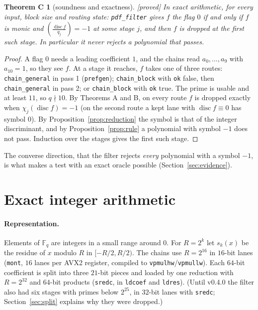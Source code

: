 \documentclass[10pt,a4paper]{article}
\newcommand{\Fq}{\mathbb{F}_q}
\DeclareMathOperator{\disc}{disc}
\newcommand{\leg}[2]{\left(\frac{#1}{#2}\right)}
\newcommand{\code}[1]{\texttt{#1}}
\newcommand{\stproved}{\textsf{\small[proved]}\xspace}
\theoremstyle{plain}
\newtheorem*{thmC}{Theorem C}
\theoremstyle{definition}
\begin{document}
\begin{thmC}[soundness and exactness]\stproved
In exact arithmetic, for every input, block size and routing state: \code{pdf\_filter} gives $f$ the flag $0$ if and only if $f$ is monic and
$\leg{\disc f}{q_j}=-1$ at some stage $j$, and then $f$ is dropped at the first such stage.  In particular it never rejects a polynomial that passes.
\end{thmC}
\begin{proof}
A flag $0$ needs a leading coefficient $1$, and the chains read $a_0,\dots,a_9$ with $a_{10}=1$, so they see $f$.  At a stage it reaches, $f$ takes one of three routes:
\code{chain\_general} in pass 1 (\code{prefgen}); \code{chain\_block} with \code{ok} false, then \code{chain\_general} in pass 2; or \code{chain\_block} with \code{ok}
true.  The prime is usable and at least $11$, so $q\nmid10$.  By Theorems A and B, on every route $f$ is dropped exactly when $\chi_j(\disc f)=-1$ (on the second route
a kept lane with $\disc f\equiv0$ has symbol $0$).  By Proposition~\ref{prop:reduction} the symbol is that of the integer discriminant, and by
Proposition~\ref{prop:rule} a polynomial with symbol $-1$ does not pass.  Induction over the stages gives the first such stage.
\end{proof}

The converse direction, that the filter rejects \emph{every} polynomial with a symbol $-1$, is what makes a test with an exact oracle possible
(Section~\ref{sec:evidence}).

\section{Exact integer arithmetic}\label{sec:integer}

\paragraph{Representation.}  Elements of $\Fq$ are integers in a small range around $0$.  For $R=2^k$ let $s_k(x)$ be the residue of $x$ modulo $R$ in
$[-R/2,R/2)$.  The chains use $R=2^{16}$ in $16$-bit lanes (\code{mont}, $16$ lanes per AVX2 register, compiled to \code{vpmulhw}/\code{vpmullw}).  Each
$64$-bit coefficient is split into three $21$-bit pieces and loaded by one reduction with $R=2^{32}$ and $64$-bit products (\code{sredc}, in \code{ldcoef} and
\code{ldres}).  (Until v0.4.0 the filter also had six stages with primes below $2^{25}$, in $32$-bit lanes with \code{sredc}; Section~\ref{sec:split} explains
why they were dropped.)
\end{document}
